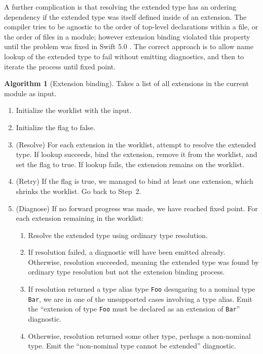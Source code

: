 \documentclass[a4paper,headsepline,bibliography=totoc,toc=flat,fleqn,twoside=semi]{scrbook}
\theoremstyle{definition}
\theoremstyle{definition}
\theoremstyle{definition}
\newtheorem{algorithm}{Algorithm}[chapter]
\begin{document}
A further complication is that resolving the extended type has an ordering dependency if the extended type was itself defined inside of an extension. The compiler tries to be agnostic to the order of top-level declarations within a file, or the order of files in a module; however extension binding violated this property until the problem was fixed in Swift 5.0 \cite{sr631}. The correct approach is to allow name lookup of the extended type to fail without emitting diagnostics, and then to iterate the process until fixed point.
\begin{algorithm}[Extension binding]
Takes a list of all extensions in the current module as input.
\begin{enumerate}
\item Initialize the worklist with the input.
\item Initialize the flag to false.
\item (Resolve) For each extension in the worklist, attempt to resolve the extended type. If lookup succeeds, bind the extension, remove it from the worklist, and set the flag to true. If lookup fails, the extension remains on the worklist.
\item (Retry) If the flag is true, we managed to bind at least one extension, which shrinks the worklist. Go back to Step~2.
\item (Diagnose) If no forward progress was made, we have reached fixed point. For each extension remaining in the worklist:
\begin{enumerate}
\item Resolve the extended type using ordinary type resolution.
\item If resolution failed, a diagnostic will have been emitted already. Otherwise, resolution succeeded, meaning the extended type was found by ordinary type resolution but not the extension binding process.
\item If resolution returned a type alias type \texttt{Foo} desugaring to a nominal type \texttt{Bar}, we are in one of the unsupported cases involving a type alias. Emit the ``extension of type \texttt{Foo} must be declared as an extension of \texttt{Bar}'' diagnostic.
\item Otherwise, resolution returned some other type, perhaps a non-nominal type. Emit the ``non-nominal type cannot be extended'' diagnostic.
\end{enumerate}
\end{enumerate}
\end{algorithm}
\end{document}
